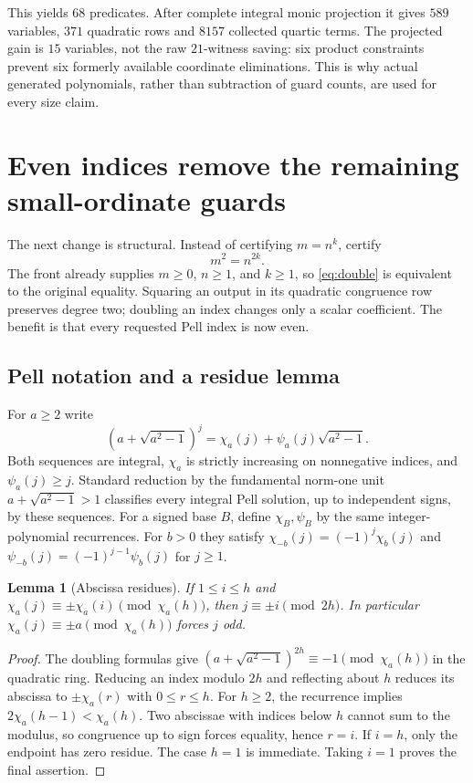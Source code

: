 \documentclass[11pt]{article}
\newtheorem{lemma}[theorem]{Lemma}\newtheorem{proposition}[theorem]{Proposition}
\theoremstyle{definition}\newtheorem{definition}[theorem]{Definition}
\theoremstyle{remark}\newtheorem{remark}[theorem]{Remark}
\begin{document}
This yields $68$ predicates. After complete integral monic projection it
gives $589$ variables, $371$ quadratic rows and $8157$ collected quartic
terms. The projected gain is $15$ variables, not the raw $21$-witness
saving: six product constraints prevent six formerly available coordinate
eliminations. This is why actual generated polynomials, rather than
subtraction of guard counts, are used for every size claim.

\section{Even indices remove the remaining small-ordinate guards}
\label{sec:even}

The next change is structural. Instead of certifying $m=n^k$, certify
\begin{equation}\label{eq:double}
 m^2=n^{2k}.
\end{equation}
The front already supplies $m\ge0$, $n\ge1$, and $k\ge1$, so \eqref{eq:double}
is equivalent to the original equality. Squaring an output in its
quadratic congruence row preserves degree two; doubling an index changes
only a scalar coefficient. The benefit is that every requested Pell
index is now even.

\subsection{Pell notation and a residue lemma}
For $a\ge2$ write
\[
 (a+\sqrt{a^2-1})^j=\chi_a(j)+\psi_a(j)\sqrt{a^2-1}.
\]
Both sequences are integral, $\chi_a$ is strictly increasing on
nonnegative indices, and $\psi_a(j)\ge j$. Standard reduction by the
fundamental norm-one unit $a+\sqrt{a^2-1}>1$ classifies every integral Pell solution,
up to independent signs, by these sequences. For a signed base $B$,
define $\chi_B,\psi_B$ by the same integer-polynomial recurrences.
For $b>0$ they satisfy $\chi_{-b}(j)=(-1)^j\chi_b(j)$ and
$\psi_{-b}(j)=(-1)^{j-1}\psi_b(j)$ for $j\ge1$.

\begin{lemma}[Abscissa residues]\label{lem:abscissa}
If $1\le i\le h$ and
$\chi_a(j)\equiv\pm\chi_a(i)\pmod{\chi_a(h)}$, then
$j\equiv\pm i\pmod{2h}$. In particular
$\chi_a(j)\equiv\pm a\pmod{\chi_a(h)}$ forces $j$ odd.
\end{lemma}
\begin{proof}
The doubling formulas give
$(a+\sqrt{a^2-1})^{2h}\equiv-1\pmod{\chi_a(h)}$ in the quadratic
ring. Reducing an index modulo $2h$ and reflecting about $h$ reduces
its abscissa to $\pm\chi_a(r)$ with $0\le r\le h$.
For $h\ge2$, the recurrence implies
$2\chi_a(h-1)<\chi_a(h)$. Two abscissae with indices below $h$
cannot sum to the modulus, so congruence up to sign forces equality,
hence $r=i$. If $i=h$, only the endpoint has zero residue. The case
$h=1$ is immediate. Taking $i=1$ proves the final assertion.
\end{proof}
\end{document}
